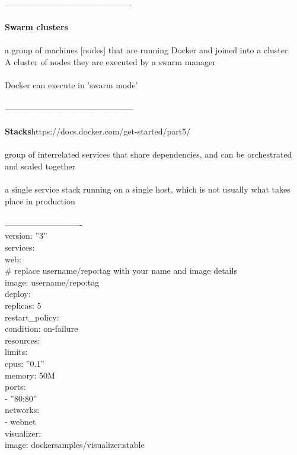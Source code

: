 \documentclass[10pt,a4paper]{article}
\begin{document}
{{{{{{{{{\\
----------------------------------------------\\
\\
\textbf{Swarm clusters}}{\large \\
\\
a group of machines [nodes] that are running Docker and joined into a cluster. \\
A cluster of nodes  they are executed by a swarm manager\\
\\
Docker can execute in 'swarm mode'\\
\\
-----------------------------------------------\\
\\
}\textbf{{\Large Stacks}}{\large }https://docs.docker.com/get-started/part5/{\large \\
\\
group of interrelated services that share dependencies, and can be orchestrated and scaled together\\
\\
a single service stack running on a single host, which is not usually what takes place in production\\
\\
----------------------------\\
version: ''3''\\
services:\\
  web:\\
    \# replace username/repo:tag with your name and image details\\
    image: username/repo:tag\\
    deploy:\\
      replicas: 5\\
      restart\_policy:\\
        condition: on-failure\\
      resources:\\
        limits:\\
          cpus: ''0.1''\\
          memory: 50M\\
    ports:\\
      - ''80:80''\\
    networks:\\
      - webnet\\
  visualizer:\\
    image: dockersamples/visualizer:stable\\
}}}}}}}}}
\end{document}
